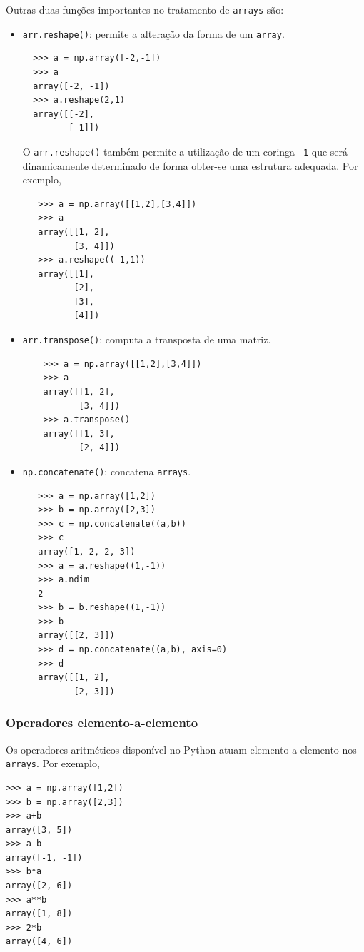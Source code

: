 \documentclass[12pt]{article}
\begin{document}
Outras duas funções importantes no tratamento de \lstinline+arrays+ são:
\begin{itemize}
\item \lstinline+arr.reshape()+: permite a alteração da forma de um \lstinline+array+.
  \begin{lstlisting}
  >>> a = np.array([-2,-1])
  >>> a
  array([-2, -1])
  >>> a.reshape(2,1)
  array([[-2],
         [-1]])
  \end{lstlisting}

   O \lstinline+arr.reshape()+ também permite a utilização de um coringa \lstinline+-1+ que será dinamicamente determinado de forma obter-se uma estrutura adequada. Por exemplo,
   \begin{lstlisting}
   >>> a = np.array([[1,2],[3,4]])
   >>> a
   array([[1, 2],
          [3, 4]])
   >>> a.reshape((-1,1))
   array([[1],
          [2],
          [3],
          [4]])
   \end{lstlisting}
\item \lstinline+arr.transpose()+: computa a transposta de uma matriz.
    \begin{lstlisting}
    >>> a = np.array([[1,2],[3,4]])
    >>> a
    array([[1, 2],
           [3, 4]])
    >>> a.transpose()
    array([[1, 3],
           [2, 4]])
    \end{lstlisting}
 \item \lstinline+np.concatenate()+: concatena \lstinline+arrays+.
   \begin{lstlisting}
   >>> a = np.array([1,2])
   >>> b = np.array([2,3])
   >>> c = np.concatenate((a,b))
   >>> c
   array([1, 2, 2, 3])
   >>> a = a.reshape((1,-1))
   >>> a.ndim
   2
   >>> b = b.reshape((1,-1))
   >>> b
   array([[2, 3]])
   >>> d = np.concatenate((a,b), axis=0)
   >>> d
   array([[1, 2],
          [2, 3]])
   \end{lstlisting}
\end{itemize}

\subsubsection{Operadores elemento-a-elemento}\label{subsubsection:ope-a-e}

Os operadores aritméticos disponível no Python atuam elemento-a-elemento nos \lstinline+arrays+. Por exemplo,
\begin{lstlisting}
>>> a = np.array([1,2])
>>> b = np.array([2,3])
>>> a+b
array([3, 5])
>>> a-b
array([-1, -1])
>>> b*a
array([2, 6])
>>> a**b
array([1, 8])
>>> 2*b
array([4, 6])
\end{lstlisting}
\end{document}
